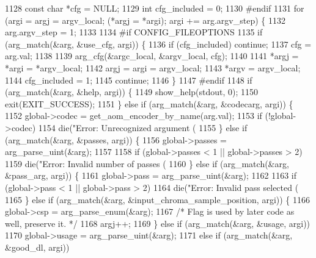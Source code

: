\begin{DoxyCodeInclude}
{{{{{{{{{{{1128   \textcolor{keyword}{const} \textcolor{keywordtype}{char} *cfg = NULL;
1129   \textcolor{keywordtype}{int} cfg\_included = 0;
1130 \textcolor{preprocessor}{#endif}
1131   \textcolor{keywordflow}{for} (argi = argj = argv\_local; (*argj = *argi); argi += arg.argv\_step) \{
1132     arg.argv\_step = 1;
1133 
1134 \textcolor{preprocessor}{#if CONFIG\_FILEOPTIONS}
1135     \textcolor{keywordflow}{if} (arg\_match(&arg, &use\_cfg, argi)) \{
1136       \textcolor{keywordflow}{if} (cfg\_included) \textcolor{keywordflow}{continue};
1137       cfg = arg.val;
1138 
1139       arg\_cfg(&argc\_local, &argv\_local, cfg);
1140 
1141       *argj = *argi = *argv\_local;
1142       argj = argi = argv\_local;
1143       *argv = argv\_local;
1144       cfg\_included = 1;
1145       \textcolor{keywordflow}{continue};
1146     \}
1147 \textcolor{preprocessor}{#endif}
1148     \textcolor{keywordflow}{if} (arg\_match(&arg, &help, argi)) \{
1149       show\_help(stdout, 0);
1150       exit(EXIT\_SUCCESS);
1151     \} \textcolor{keywordflow}{else} \textcolor{keywordflow}{if} (arg\_match(&arg, &codecarg, argi)) \{
1152       global->codec = get\_aom\_encoder\_by\_name(arg.val);
1153       \textcolor{keywordflow}{if} (!global->codec)
1154         die(\textcolor{stringliteral}{"Error: Unrecognized argument (%
1155     \} \textcolor{keywordflow}{else} \textcolor{keywordflow}{if} (arg\_match(&arg, &passes, argi)) \{
1156       global->passes = arg\_parse\_uint(&arg);
1157 
1158       \textcolor{keywordflow}{if} (global->passes < 1 || global->passes > 2)
1159         die(\textcolor{stringliteral}{"Error: Invalid number of passes (%
1160     \} \textcolor{keywordflow}{else} \textcolor{keywordflow}{if} (arg\_match(&arg, &pass\_arg, argi)) \{
1161       global->pass = arg\_parse\_uint(&arg);
1162 
1163       \textcolor{keywordflow}{if} (global->pass < 1 || global->pass > 2)
1164         die(\textcolor{stringliteral}{"Error: Invalid pass selected (%
1165     \} \textcolor{keywordflow}{else} \textcolor{keywordflow}{if} (arg\_match(&arg, &input\_chroma\_sample\_position, argi)) \{
1166       global->csp = arg\_parse\_enum(&arg);
1167       \textcolor{comment}{/* Flag is used by later code as well, preserve it. */}
1168       argj++;
1169     \} \textcolor{keywordflow}{else} \textcolor{keywordflow}{if} (arg\_match(&arg, &usage, argi))
1170       global->usage = arg\_parse\_uint(&arg);
1171     \textcolor{keywordflow}{else} \textcolor{keywordflow}{if} (arg\_match(&arg, &good\_dl, argi))
}}}}}}}}}}}}}}
\end{DoxyCodeInclude}
